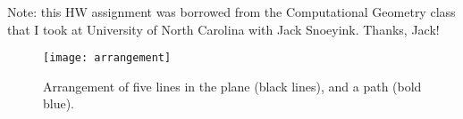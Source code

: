 \documentclass{article}
\begin{document}
Note: this HW assignment was borrowed from the Computational Geometry class that
I took at University of North Carolina with Jack Snoeyink.  Thanks, Jack!

\begin{figure}[bht]
    \centering
    \texttt{[image: arrangement]}
    \caption{Arrangement of five lines in the plane (black lines), and a path
    (bold blue).}\label{fig:arrangement}
\end{figure}
\end{document}

